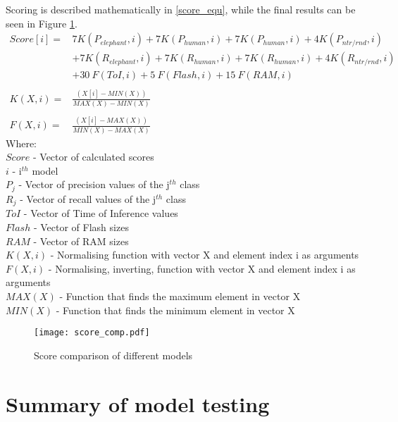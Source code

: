Scoring is described mathematically in \ref{score_equ}, while the final results can be seen in Figure \ref{score_comp}.
\begin{equation}\label{score_equ}
    \begin{aligned}
        Score[i] ={} & 7 K(P_{elephant},i) + 7 K(P_{human},i) + 7 K(P_{human},i) + 4 K(P_{ntr/rnd},i) \\
                     & +{} 7 K(R_{elephant},i) + 7 K(R_{human},i) + 7 K(R_{human},i) + 4 K(R_{ntr/rnd},i) \\
                  & +{} 30\: F(ToI, i) +5\: F(Flash, i) + 15\: F(RAM, i)   \\
                  & \\
        K(X, i) ={}  & \frac{(X[i] - MIN(X))}{MAX(X)- MIN(X)} \\
                  & \\
        F(X, i) ={}  & \frac{(X[i] - MAX(X))}{MIN(X)- MAX(X)}
    \end{aligned}
\end{equation}
Where:\\
$Score$ - Vector of calculated scores\\
$i$ - i$^{th}$ model\\
$P_{j}$ - Vector of precision values of the j$^{th}$ class\\
$R_{j}$ - Vector of recall values of the j$^{th}$ class\\
$ToI$ - Vector of Time of Inference values\\
$Flash$ - Vector of Flash sizes\\
$RAM$ - Vector of RAM sizes\\
$K(X,i)$ - Normalising function with vector X and element index i as arguments\\
$F(X,i)$ - Normalising, inverting, function with vector X and element index i as arguments\\
$MAX(X)$ - Function that finds the maximum element in vector X\\
$MIN(X)$ - Function that finds the minimum element in vector X
\begin{figure}[ht]
    \centering
    \texttt{[image: score\_comp.pdf]}
    \caption{ Score comparison of different models}
    \label{score_comp}
\end{figure}

\section{ Summary of model testing}

